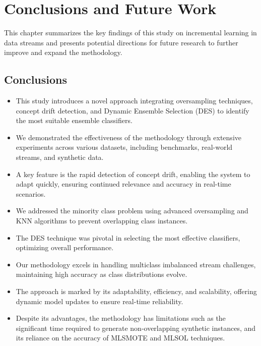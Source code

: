 \chapter{Conclusions and Future Work}
\label{chapter:7_Conclusions}
This chapter summarizes the key findings of this study on incremental learning in data streams and presents potential directions for future research to further improve and expand the methodology.

\section{Conclusions}
\label{section:7_1}
\begin{itemize}
    \setlength{\itemsep}{1.5pt}
    \setlength{\parskip}{1.5pt}
    \item This study introduces a novel approach integrating oversampling techniques, concept drift detection, and Dynamic Ensemble Selection (DES) to identify the most suitable ensemble classifiers.
    \item We demonstrated the effectiveness of the methodology through extensive experiments across various datasets, including benchmarks, real-world streams, and synthetic data.
    \item A key feature is the rapid detection of concept drift, enabling the system to adapt quickly, ensuring continued relevance and accuracy in real-time scenarios.
    \item We addressed the minority class problem using advanced oversampling and KNN algorithms to prevent overlapping class instances.
    \item The DES technique was pivotal in selecting the most effective classifiers, optimizing overall performance.
    \item Our methodology excels in handling multiclass imbalanced stream challenges, maintaining high accuracy as class distributions evolve.
    \item The approach is marked by its adaptability, efficiency, and scalability, offering dynamic model updates to ensure real-time reliability.
    \item Despite its advantages, the methodology has limitations such as the significant time required to generate non-overlapping synthetic instances, and its reliance on the accuracy of MLSMOTE and MLSOL techniques.
\end{itemize}


